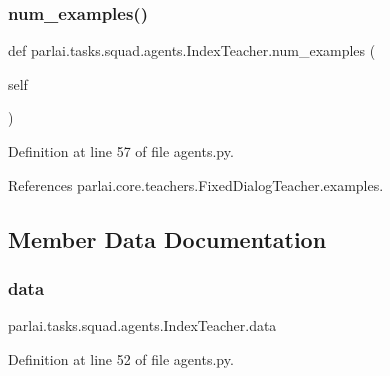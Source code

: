 \subsubsection{\texorpdfstring{num\+\_\+examples()}{num\_examples()}}
{\footnotesize\ttfamily def parlai.\+tasks.\+squad.\+agents.\+Index\+Teacher.\+num\+\_\+examples (\begin{DoxyParamCaption}\item[{}]{self }\end{DoxyParamCaption})}



Definition at line 57 of file agents.\+py.



References parlai.\+core.\+teachers.\+Fixed\+Dialog\+Teacher.\+examples.



\subsection{Member Data Documentation}
\mbox{\label{classparlai_1_1tasks_1_1squad_1_1agents_1_1IndexTeacher_a5642534b352e57c59dec249f9305d80d}} 
\subsubsection{\texorpdfstring{data}{data}}
{\footnotesize\ttfamily parlai.\+tasks.\+squad.\+agents.\+Index\+Teacher.\+data}



Definition at line 52 of file agents.\+py.



